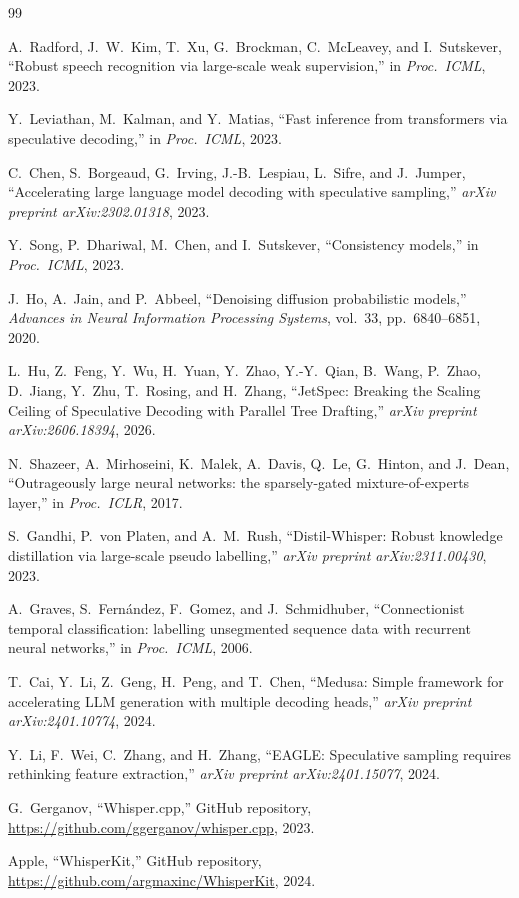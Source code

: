\documentclass[11pt,a4paper]{article}
\begin{document}
\begin{thebibliography}{99}

A.~Radford, J.~W.~Kim, T.~Xu, G.~Brockman, C.~McLeavey, and I.~Sutskever,
``Robust speech recognition via large-scale weak supervision,''
in \emph{Proc.\ ICML}, 2023.

Y.~Leviathan, M.~Kalman, and Y.~Matias,
``Fast inference from transformers via speculative decoding,''
in \emph{Proc.\ ICML}, 2023.

C.~Chen, S.~Borgeaud, G.~Irving, J.-B.~Lespiau, L.~Sifre, and J.~Jumper,
``Accelerating large language model decoding with speculative sampling,''
\emph{arXiv preprint arXiv:2302.01318}, 2023.

Y.~Song, P.~Dhariwal, M.~Chen, and I.~Sutskever,
``Consistency models,''
in \emph{Proc.\ ICML}, 2023.

J.~Ho, A.~Jain, and P.~Abbeel,
``Denoising diffusion probabilistic models,''
\emph{Advances in Neural Information Processing Systems}, vol.~33, pp.~6840--6851, 2020.

L.~Hu, Z.~Feng, Y.~Wu, H.~Yuan, Y.~Zhao, Y.-Y.~Qian, B.~Wang, P.~Zhao, D.~Jiang, Y.~Zhu, T.~Rosing, and H.~Zhang,
``JetSpec: Breaking the Scaling Ceiling of Speculative Decoding with Parallel Tree Drafting,''
\emph{arXiv preprint arXiv:2606.18394}, 2026.

N.~Shazeer, A.~Mirhoseini, K.~Malek, A.~Davis, Q.~Le, G.~Hinton, and J.~Dean,
``Outrageously large neural networks: the sparsely-gated mixture-of-experts layer,''
in \emph{Proc.\ ICLR}, 2017.

S.~Gandhi, P.~von Platen, and A.~M.~Rush,
``Distil-Whisper: Robust knowledge distillation via large-scale pseudo labelling,''
\emph{arXiv preprint arXiv:2311.00430}, 2023.

A.~Graves, S.~Fern{\'a}ndez, F.~Gomez, and J.~Schmidhuber,
``Connectionist temporal classification: labelling unsegmented sequence data with recurrent neural networks,''
in \emph{Proc.\ ICML}, 2006.

T.~Cai, Y.~Li, Z.~Geng, H.~Peng, and T.~Chen,
``Medusa: Simple framework for accelerating LLM generation with multiple decoding heads,''
\emph{arXiv preprint arXiv:2401.10774}, 2024.

Y.~Li, F.~Wei, C.~Zhang, and H.~Zhang,
``EAGLE: Speculative sampling requires rethinking feature extraction,''
\emph{arXiv preprint arXiv:2401.15077}, 2024.

G.~Gerganov,
``Whisper.cpp,''
GitHub repository, \url{https://github.com/ggerganov/whisper.cpp}, 2023.

Apple,
``WhisperKit,''
GitHub repository, \url{https://github.com/argmaxinc/WhisperKit}, 2024.

\end{thebibliography}
\end{document}
